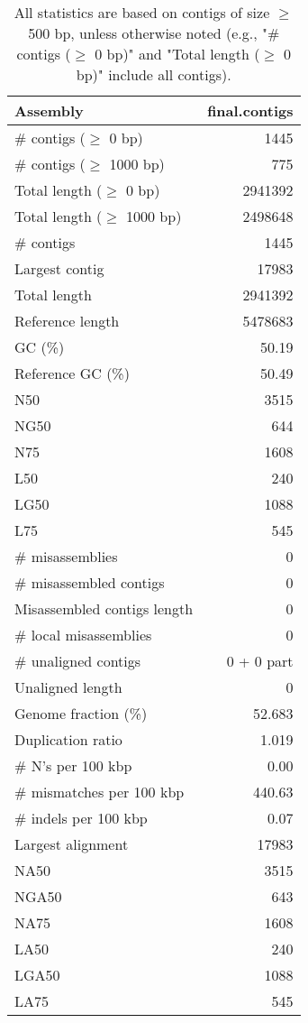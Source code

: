 \documentclass[12pt,a4paper]{article}
\begin{document}
\begin{table}[ht]
\begin{center}
\caption{All statistics are based on contigs of size $\geq$ 500 bp, unless otherwise noted (e.g., "\# contigs ($\geq$ 0 bp)" and "Total length ($\geq$ 0 bp)" include all contigs).}
\begin{tabular}{|l*{1}{|r}|}
\hline
Assembly & final.contigs \\ \hline
\# contigs ($\geq$ 0 bp) & 1445 \\ \hline
\# contigs ($\geq$ 1000 bp) & 775 \\ \hline
Total length ($\geq$ 0 bp) & 2941392 \\ \hline
Total length ($\geq$ 1000 bp) & 2498648 \\ \hline
\# contigs & 1445 \\ \hline
Largest contig & 17983 \\ \hline
Total length & 2941392 \\ \hline
Reference length & 5478683 \\ \hline
GC (\%) & 50.19 \\ \hline
Reference GC (\%) & 50.49 \\ \hline
N50 & 3515 \\ \hline
NG50 & 644 \\ \hline
N75 & 1608 \\ \hline
L50 & 240 \\ \hline
LG50 & 1088 \\ \hline
L75 & 545 \\ \hline
\# misassemblies & 0 \\ \hline
\# misassembled contigs & 0 \\ \hline
Misassembled contigs length & 0 \\ \hline
\# local misassemblies & 0 \\ \hline
\# unaligned contigs & 0 + 0 part \\ \hline
Unaligned length & 0 \\ \hline
Genome fraction (\%) & 52.683 \\ \hline
Duplication ratio & 1.019 \\ \hline
\# N's per 100 kbp & 0.00 \\ \hline
\# mismatches per 100 kbp & 440.63 \\ \hline
\# indels per 100 kbp & 0.07 \\ \hline
Largest alignment & 17983 \\ \hline
NA50 & 3515 \\ \hline
NGA50 & 643 \\ \hline
NA75 & 1608 \\ \hline
LA50 & 240 \\ \hline
LGA50 & 1088 \\ \hline
LA75 & 545 \\ \hline
\end{tabular}
\end{center}
\end{table}
\end{document}
